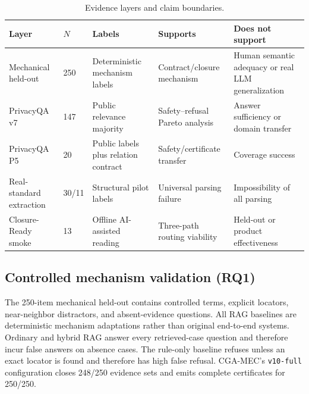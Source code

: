 \documentclass[11pt]{article}
\newcommand{\method}{CGA-MEC}
\begin{document}
\begin{table}[t]
\centering
\caption{Evidence layers and claim boundaries.}
\label{tab:layers}
\small
\begin{tabular}{@{}lp{0.7cm}p{2.6cm}p{3.6cm}p{3.9cm}@{}}
\toprule
Layer & $N$ & Labels & Supports & Does not support \\
\midrule
Mechanical held-out & 250 & Deterministic mechanism labels & Contract/closure mechanism & Human semantic adequacy or real LLM generalization \\
PrivacyQA v7 & 147 & Public relevance majority & Safety--refusal Pareto analysis & Answer sufficiency or domain transfer \\
PrivacyQA P5 & 20 & Public labels plus relation contract & Safety/certificate transfer & Coverage success \\
Real-standard extraction & 30/11 & Structural pilot labels & Universal parsing failure & Impossibility of all parsing \\
Closure-Ready smoke & 13 & Offline AI-assisted reading & Three-path routing viability & Held-out or product effectiveness \\
\bottomrule
\end{tabular}
\end{table}

\subsection{Controlled mechanism validation (RQ1)}

The 250-item mechanical held-out contains controlled terms, explicit locators, near-neighbor distractors, and absent-evidence questions. All RAG baselines are deterministic mechanism adaptations rather than original end-to-end systems. Ordinary and hybrid RAG answer every retrieved-case question and therefore incur false answers on absence cases. The rule-only baseline refuses unless an exact locator is found and therefore has high false refusal. \method{}'s \texttt{v10-full} configuration closes 248/250 evidence sets and emits complete certificates for 250/250.
\end{document}
